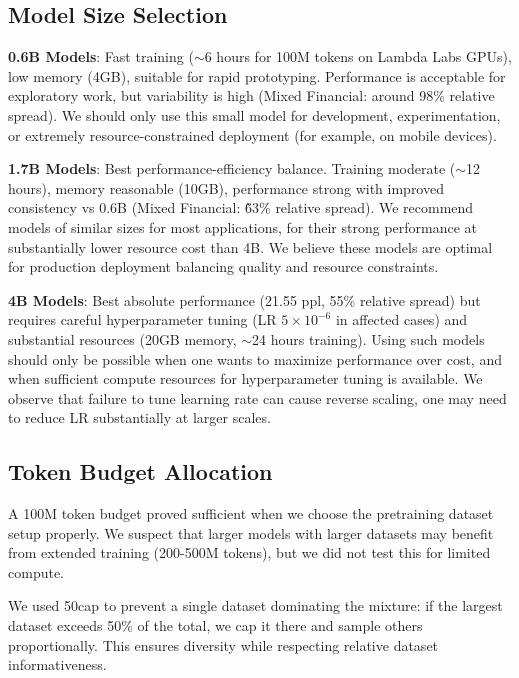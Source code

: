 
\subsection{Model Size Selection}

\textbf{0.6B Models}: Fast training ($\sim$6 hours for 100M tokens on Lambda Labs GPUs), low memory (4GB), suitable for rapid prototyping. Performance is acceptable for exploratory work, but variability is high (Mixed Financial:  around 98\% relative spread). We should only use this small model for development, experimentation, or extremely resource-constrained deployment (for example, on mobile devices).

\textbf{1.7B Models}: Best performance-efficiency balance. Training moderate ($\sim$12 hours), memory reasonable (10GB), performance strong with improved consistency vs 0.6B (Mixed Financial: \~63\% relative spread). We recommend models of similar sizes for most applications, for their strong performance at substantially lower resource cost than 4B. We believe these models are optimal for production deployment balancing quality and resource constraints.

\textbf{4B Models}: Best absolute performance (21.55 ppl, 55\% relative spread) but requires careful hyperparameter tuning (LR $5 \times 10^{-6}$ in affected cases) and substantial resources (20GB memory, $\sim$24 hours training). Using such models should only be possible when one wants to maximize performance over cost, and when sufficient compute resources for hyperparameter tuning is available. We observe that failure to tune learning rate can cause reverse scaling, one may need to reduce LR substantially at larger scales.

\subsection{Token Budget Allocation}

A 100M token budget proved sufficient when we choose the pretraining dataset setup properly. We suspect that larger models with larger datasets may benefit from extended training (200-500M tokens), but we did not test this for limited compute.

We used 50cap to prevent a single dataset dominating the mixture: if the largest dataset exceeds 50\% of the total, we cap it there and sample others proportionally. This ensures diversity while respecting relative dataset informativeness.